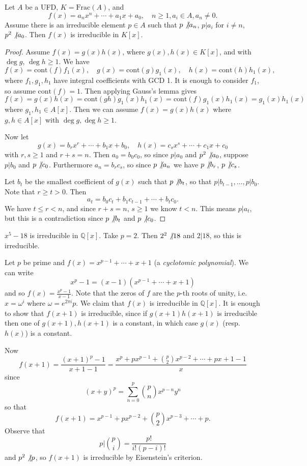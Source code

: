 \begin{theorem}
Let $A$ be a UFD, $K = \mathrm{Frac}(A)$, and
$$
f(x) = a_n x^n + \cdots + a_1 x + a_0, \quad
n \geq 1, a_i \in A, a_n \neq 0.
$$
Assume there is an irreducible element $p \in A$ such that
$p \not\vert a_n$, $p \vert a_i$ for $i \neq n$, $p^2 \not\vert
a_0$. Then $f(x)$ is irreducible in $K[x]$.
\end{theorem}
\begin{proof}
Assume $f(x) = g(x) h(x)$, where $g(x), h(x) \in K[x]$, and with
$\deg g$, $\deg h \geq 1$. We have
$$
f(x) = \mathrm{cont}(f) f_1(x), \quad
g(x) = \mathrm{cont}(g) g_1(x), \quad
h(x) = \mathrm{cont}(h) h_1(x),
$$
where $f_1, g_1, h_1$ have integral coefficients with GCD 1.
It is enough to consider $f_1$, so assume $\mathrm{cont}(f) = 1$. Then
applying Gauss's lemma gives
$$
  f(x)
= g(x)h(x)
= \mathrm{cont}(gh) g_1(x) h_1(x)
= \mathrm{cont}(f) g_1(x) h_1(x)
= g_1(x) h_1(x)
$$
where $g_1, h_1 \in A[x]$. Then we can assume
$f(x) = g(x) h(x)$ where $g, h \in A[x]$ with
$\deg g, \deg h \geq 1$.

Now let
$$
g(x) = b_r x^r + \cdots + b_1 x + b_0, \quad
h(x) = c_s x^s + \cdots + c_1 x + c_0
$$
with $r, s \geq 1$ and $r + s = n$. Then
$a_0 = b_0 c_0$, so since $p \vert a_0$ and
$p^2 \not\vert a_0$, suppose $p \vert b_0$ and
$p \not\vert c_0$. Furthermore
$a_n = b_r c_s$, so since $p \not\vert a_n$ we have
$p \not\vert b_r$, $p \not\vert c_s$.

Let $b_t$ be the smallest coefficient of $g(x)$ such that
$p \not\vert b_t$, so that
$p \vert b_{t-1}, \dots, p \vert b_0$. Note that
$r \geq t > 0$.
Then
$$
a_t = b_0 c_t + b_1 c_{t-1} + \cdots + b_t c_0.
$$
We have $t \leq r < n$, and since $r + s = n$, $s \geq 1$
we know $t < n$. This means $p \vert a_t$, but this is a contradiction
since $p \not\vert b_t$ and $p \not\vert c_0$.
\end{proof}

\begin{xmpl}
$x^5 - 18$ is irreducible in $\mathbb{Q}[x]$. Take
$p = 2$. Then $2^2 \not\vert 18$ and $2 \vert 18$, so this is
irreducible.

Let $p$ be prime and
$f(x) = x^{p-1} + \cdots + x + 1$ (a \emph{cyclotomic polynomial}).
We can write
$$
x^p - 1 = (x - 1)(x^{p-1} + \cdots + x + 1)
$$
and so $f(x) = \frac{x^p - 1}{x - 1}$. Note that the zeros of $f$
are the $p$-th roots of unity, i.e. $x = \omega^i$ where
$\omega = e^{2\pi i}{p}$. We claim that $f(x)$ is irreducible in
$\mathbb{Q}[x]$. It is enough to show that $f(x + 1)$ is irreducible,
since if $g(x + 1)h(x + 1)$ is irreducible then one of $g(x+1),
h(x+1)$ is a constant, in which case $g(x)$ (resp. $h(x)$) is a
constant.

Now
$$
  f(x + 1)
= \frac{(x + 1)^p - 1}{x + 1 - 1}
= \frac{x^p + p x^{p-1} + {p \choose 2} x^{p-2} + \cdots + p x + 1 - 1}{x}
$$
since
$$
(x + y)^p = \sum_{n=0}^p {p \choose n} x^{p-n} y^n
$$
so that
$$
f(x + 1) = x^{p-1} + p x^{p-2} + {p \choose 2} x^{p-3} + \cdots + p.
$$
Observe that
$$
p \vert {p \choose i} = \frac{p!}{i!(p-i)!}
$$
and $p^2 \not\vert p$, so $f(x+1)$ is irreducible by Eisenstein's criterion.
\end{xmpl}

